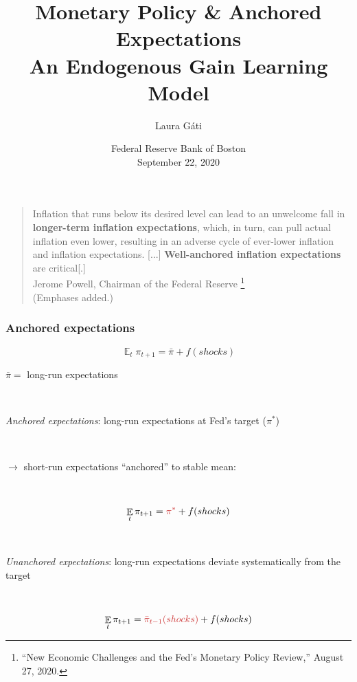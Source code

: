 \documentclass[10pt]{beamer}
\author[]{Laura G\'ati}
\institute[]{Boston College}
\title[]{Monetary Policy \& Anchored Expectations \\
An Endogenous Gain Learning Model}
\date[]{Federal Reserve Bank of Boston \\ \vspace{0.5cm }September 22, 2020}
\DeclareMathOperator{\E}{\mathbb{E}}
\begin{document}
\begin{frame}[plain] %

\maketitle

\end{frame}




\begin{frame}\label{motivation}
	
\begin{quote}
Inflation that runs below its desired level can lead to an unwelcome fall in \textbf{longer-term inflation expectations}, which, in turn, can pull actual inflation even lower, resulting in an adverse cycle of ever-lower inflation and inflation expectations.
[...]  \textbf{Well-anchored inflation expectations} are critical[.]  \\
Jerome Powell, Chairman of the Federal Reserve \footnote{``New Economic Challenges and the Fed's Monetary Policy Review,''  August 27, 2020.} \\
(Emphases added.)
\end{quote}	



\end{frame}
\begin{frame}
\frametitle{Anchored expectations}

\begin{equation}
\E_t \pi_{t+1} = \bar{\pi}+ f(shocks)
\end{equation}

$\bar{\pi} = $ long-run expectations

\

\pause
	
\emph{Anchored expectations}: long-run expectations at Fed's target ($\pi^*$) 

\

\pause

$\rightarrow$ short-run expectations ``anchored'' to stable mean: 


\

\begin{equation}
\E_t \pi_{t+1} = \textcolor{brownreddark}{\pi^*} + f(shocks)
\end{equation}

\

\pause

\emph{Unanchored expectations}: long-run expectations deviate systematically from the target


\

\begin{equation}
\E_t \pi_{t+1} = \textcolor{brownreddark}{\bar{\pi}_{t-1}(shocks)} + f(shocks)
\end{equation}


\end{frame}
\end{document}
